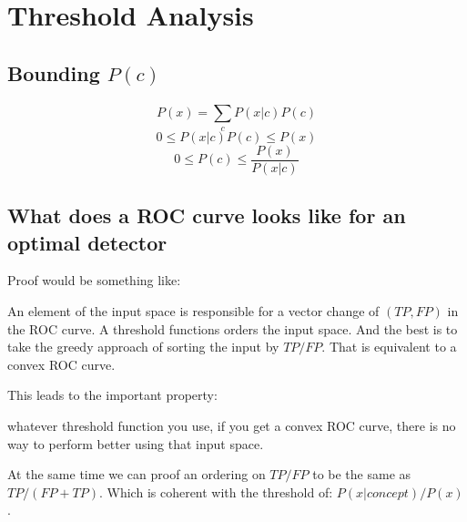 \documentclass[a4paper]{article}
\begin{document}
\clearpage
\section{Threshold Analysis}
\label{sec:threshold-analysis}

\subsection{Bounding $P(c)$}

\begin{equation}P(x) = \sum_{c}^{} P(x|c) P(c)\end{equation}
\begin{equation}0 \le P(x|c) P(c) \le P(x)\end{equation}
\begin{equation}0 \le P(c) \le \frac{P(x)}{P(x|c)}\end{equation}


\subsection{What does a ROC curve looks like for an optimal detector}

Proof would be something like:

An element of the input space is responsible for a vector change of $(TP, FP)$ in the ROC
curve.
A threshold functions orders the input space.
And the best is to take the greedy approach of sorting the input by $TP/FP$.
That is equivalent to a convex ROC curve.

This leads to the important property:

whatever threshold function you use,
if you get a convex ROC curve, there is no way to perform better using that input space.

At the same time we can proof an ordering on $TP/FP$ to be the same as $TP/(FP+TP)$.
Which is coherent with the threshold of: $P(x|concept)/P(x)$.
\end{document}
